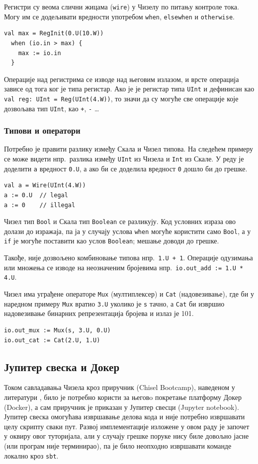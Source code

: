 \documentclass[12pt, a4paper]{article}
\theoremstyle{definition}
\begin{document}
Регистри су веома слични жицама (\verb+wire+) у Чизелу по питању контроле тока. Могу им се додељивати вредности употребом \verb+when+, \verb+elsewhen+ и \verb+otherwise+.

\begin{verbatim}
val max = RegInit(0.U(10.W))
  when (io.in > max) {
    max := io.in
  }
\end{verbatim}

Операције над регистрима се изводе над његовим излазом, и врсте операција зависе од тога ког је типа регистар. Ако је је регистар типа \verb+UInt+ и дефинисан као \verb+val reg: UInt = Reg(UInt(4.W))+, то значи да су могуће све операције које дозвољава тип \verb+UInt+, као \verb-+-, \verb+-+ \dots

\subsubsection{Типови и оператори}
Потребно је правити разлику између Скала и Чизел типова. На следећем примеру се може видети нпр.\ разлика између \verb+UInt+ из Чизела и \verb+Int+ из Скале. У реду је доделити \verb+a+ вредност \verb+0.U+, а ако би се доделила вредност \verb+0+ дошло би до грешке.
\begin{verbatim}
val a = Wire(UInt(4.W))
a := 0.U  // legal
a := 0    // illegal
\end{verbatim}

Чизел тип \verb+Bool+ и Скала тип \verb+Boolean+ се разликују. Код условних израза ово долази до изражаја, па ја у случају услова \verb+when+ могуће користити само \verb+Bool+, а у \verb+if+ је могуће поставити као услов \verb+Boolean+; мешање доводи до грешке.

Такође, није дозвољено комбиновање типова нпр.\ \verb-1.U + 1-. Операције одузимања или множења се изводе на неозначеним бројевима нпр.\ \verb+io.out_add := 1.U * 4.U+.

Чизел има уграђене операторе \verb+Mux+ (мултиплексер) и \verb+Cat+ (надовезивање), где би у наредном примеру \verb+Mux+ вратио \verb+3.U+ уколико је \verb+s+ тачно, а \verb+Cat+ би извршио надовезивање бинарних репрезентација бројева и излаз је 101.
\begin{verbatim}
io.out_mux := Mux(s, 3.U, 0.U)
io.out_cat := Cat(2.U, 1.U)
\end{verbatim}


\subsection{Јупитер свеска и Докер}
Током савладавања Чизела кроз приручник (Chisel Bootcamp), наведеном у литератури \cite{git_chisel}, било је потребно користи за његовo покретање платформу Докер (Docker), а сам приручник је приказан у Јупитер свесци (Jupyter notebook). Јупитер свеска омогућава извршавање делова кода и није потребно извршавати целу скрипту сваки пут. Развој имплементације изложене у овом раду је започет у оквиру овог туторијала, али у случају грешке поруке нису биле довољно јасне (или програм није терминирао), па је било неопходно извршавати команде локално кроз \verb+sbt+.
\end{document}
